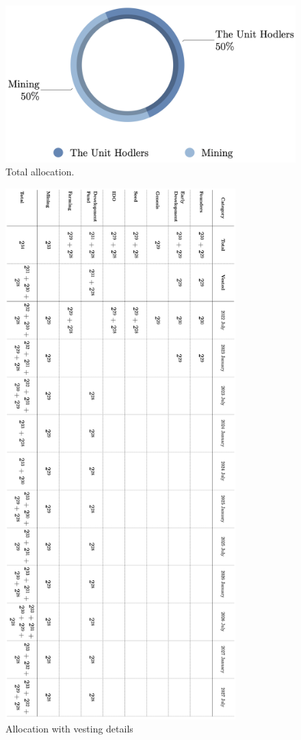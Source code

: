 \documentclass[12pt]{article}
\begin{document}
\begin{figure}[h!]
\centering
  \includegraphics[width=5in]{images/Blocktree_Allocation.png}
  \caption{Total allocation.}
  \label{fig:allocation}
\end{figure}



\begin{figure}[H]
\centering
  \includegraphics[width=3.5in]{images/Blocktree_Allocation_Table.png}
  \caption{Allocation with vesting details}
  \label{fig:allocation_table}
\end{figure}
\end{document}
